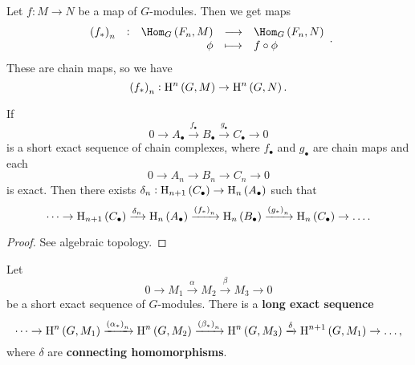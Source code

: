 \begin{corollary}
Let $ f : M \to N $ be a map of $ G $-modules. Then we get maps
$$ \function[\br{f_*}_n]{\Hom_G\br{F_n, M}}{\Hom_G\br{F_n, N}}{\phi}{f \circ \phi}. $$
These are chain maps, so we have
$$ \br{f_*}_n : \H^n\br{G, M} \to \H^n\br{G, N}. $$
\end{corollary}


\begin{lemma}
If
$$ 0 \to A_\bullet \xrightarrow{f_\bullet} B_\bullet \xrightarrow{g_\bullet} C_\bullet \to 0 $$
is a short exact sequence of chain complexes, where $ f_\bullet $ and $ g_\bullet $ are chain maps and each
$$ 0 \to A_n \to B_n \to C_n \to 0 $$
is exact. Then there exists $ \delta_n : \H_{n + 1}\br{C_\bullet} \to \H_n\br{A_\bullet} $ such that
$$ \dots \to \H_{n + 1}\br{C_\bullet} \xrightarrow{\delta_n} \H_n\br{A_\bullet} \xrightarrow{\br{f_*}_n} \H_n\br{B_\bullet} \xrightarrow{\br{g_*}_n} \H_n\br{C_\bullet} \to \dots. $$
\end{lemma}

\begin{proof}
See algebraic topology.
\end{proof}

\pagebreak

\begin{proposition}
\label{prop:5.1.28}
Let
$$ 0 \to M_1 \xrightarrow{\alpha} M_2 \xrightarrow{\beta} M_3 \to 0 $$
be a short exact sequence of $ G $-modules. There is a \textbf{long exact sequence}
$$ \dots \to \H^n\br{G, M_1} \xrightarrow{\br{\alpha_*}_n} \H^n\br{G, M_2} \xrightarrow{\br{\beta_*}_n} \H^n\br{G, M_3} \xrightarrow{\delta} \H^{n + 1}\br{G, M_1} \to \dots, $$
where $ \delta $ are \textbf{connecting homomorphisms}.
\end{proposition}

